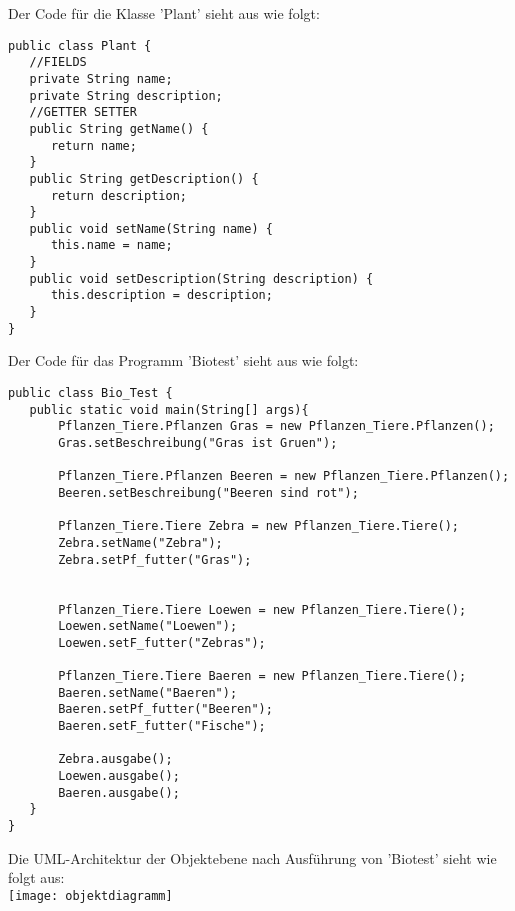 \documentclass[12pt,a4paper,oneside,ngerman]{article}
\begin{document}
Der Code für die Klasse 'Plant' sieht aus wie folgt:
\begin{lstlisting}
public class Plant {
   //FIELDS
   private String name;
   private String description;
   //GETTER SETTER
   public String getName() {
      return name;
   }
   public String getDescription() {
      return description;
   }
   public void setName(String name) {
      this.name = name;
   }
   public void setDescription(String description) {
      this.description = description;
   }
}
\end{lstlisting}
Der Code für das Programm 'Biotest' sieht aus wie folgt:
\begin{lstlisting}
public class Bio_Test {
   public static void main(String[] args){
       Pflanzen_Tiere.Pflanzen Gras = new Pflanzen_Tiere.Pflanzen();
       Gras.setBeschreibung("Gras ist Gruen");

       Pflanzen_Tiere.Pflanzen Beeren = new Pflanzen_Tiere.Pflanzen();
       Beeren.setBeschreibung("Beeren sind rot");

       Pflanzen_Tiere.Tiere Zebra = new Pflanzen_Tiere.Tiere();
       Zebra.setName("Zebra");
       Zebra.setPf_futter("Gras");


       Pflanzen_Tiere.Tiere Loewen = new Pflanzen_Tiere.Tiere();
       Loewen.setName("Loewen");
       Loewen.setF_futter("Zebras");

       Pflanzen_Tiere.Tiere Baeren = new Pflanzen_Tiere.Tiere();
       Baeren.setName("Baeren");
       Baeren.setPf_futter("Beeren");
       Baeren.setF_futter("Fische");

       Zebra.ausgabe();
       Loewen.ausgabe();
       Baeren.ausgabe();
   }
}
\end{lstlisting}
Die UML-Architektur der Objektebene nach Ausführung von 'Biotest' sieht wie folgt aus:\\
\texttt{[image: objektdiagramm]}
\end{document}

